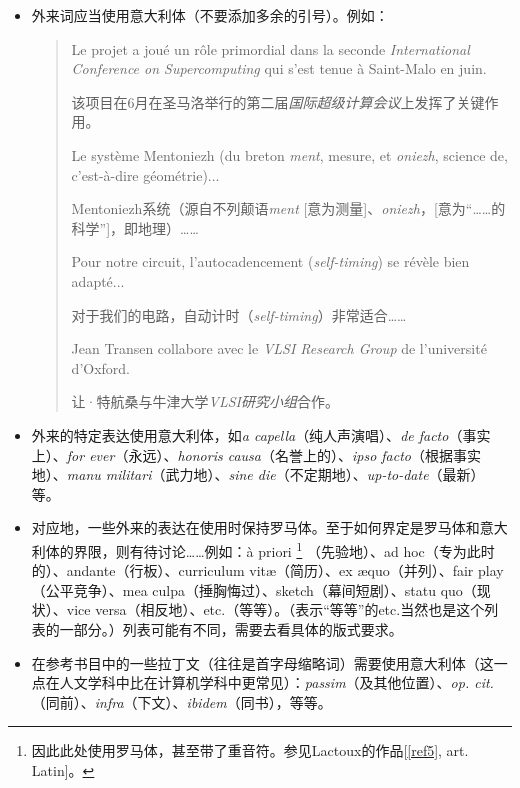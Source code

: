 \begin{itemize}
    \item 外来词应当使用意大利体（不要添加多余的引号）。例如：
    \begin{quote}
        Le projet a joué un rôle primordial dans la seconde \emph{International Conference on Supercomputing} qui s'est tenue à Saint-Malo en juin.
        \begin{bil}
            该项目在6月在圣马洛举行的第二届\emph{国际超级计算会议}上发挥了关键作用。
        \end{bil}

        Le système Mentoniezh (du breton \emph{ment}, mesure, et \emph{oniezh}, science de, c'est-à-dire géométrie)...
        \begin{bil}
            Mentoniezh系统（源自不列颠语\emph{ment} [意为测量]、\emph{oniezh}，[意为``……的科学'']，即地理）……
        \end{bil}

        Pour notre circuit, l'autocadencement (\emph{self-timing}) se révèle bien adapté...
        \begin{bil}
            对于我们的电路，自动计时（\emph{self-timing}）非常适合……
        \end{bil}

        Jean Transen collabore avec le \emph{VLSI Research Group} de l'université d'Oxford.
        \begin{bil}
            让·特航桑与牛津大学\emph{VLSI研究小组}合作。
        \end{bil}
    \end{quote}
    \item 外来的特定表达使用意大利体，如\emph{a capella}（纯人声演唱）、\emph{de facto}（事实上）、\emph{for ever}（永远）、\emph{honoris causa}（名誉上的）、\emph{ipso facto}（根据事实地）、\emph{manu militari}（武力地）、\emph{sine die}（不定期地）、\emph{up-to-date}（最新）等。
    \item 对应地，一些外来的表达在使用时保持罗马体。至于如何界定是罗马体和意大利体的界限，则有待讨论……例如：à priori
        \footnote{因此此处使用罗马体，甚至带了重音符。参见Lactoux的作品[\ref{ref5}, art. Latin]。\label{note19}}
    （先验地）、ad hoc（专为此时的）、andante（行板）、curriculum vitæ（简历）、ex æquo（并列）、fair play（公平竞争）、mea culpa（捶胸悔过）、sketch（幕间短剧）、statu quo（现状）、vice versa（相反地）、etc.（等等）。（表示``等等''的etc.当然也是这个列表的一部分。）列表可能有不同，需要去看具体的版式要求。
    \item 在参考书目中的一些拉丁文（往往是首字母缩略词）需要使用意大利体（这一点在人文学科中比在计算机学科中更常见）：\emph{passim}（及其他位置）、\emph{op. cit.}（同前）、\emph{infra}（下文）、\emph{ibidem}（同书），等等。
\end{itemize}

